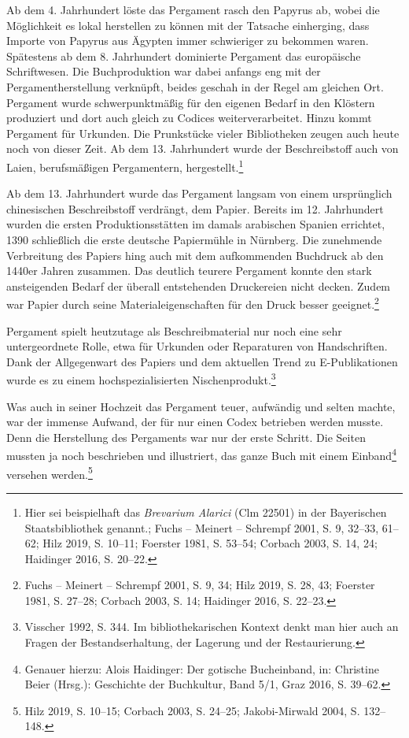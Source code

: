 \documentclass[a4paper,
fontsize=11pt,
oneside,
numbers=noperiodatend,
parskip=half-,
bibliography=totoc,
final
]{scrartcl}
\begin{document}
Ab dem 4. Jahrhundert löste das Pergament rasch den Papyrus ab, wobei
die Möglichkeit es lokal herstellen zu können mit der Tatsache
einherging, dass Importe von Papyrus aus Ägypten immer schwieriger zu
bekommen waren. Spätestens ab dem 8. Jahrhundert dominierte Pergament
das europäische Schriftwesen. Die Buchproduktion war dabei anfangs eng
mit der Pergamentherstellung verknüpft, beides geschah in der Regel am
gleichen Ort. Pergament wurde schwerpunktmäßig für den eigenen Bedarf in
den Klöstern produziert und dort auch gleich zu Codices
weiterverarbeitet. Hinzu kommt Pergament für Urkunden. Die Prunkstücke
vieler Bibliotheken zeugen auch heute noch von dieser Zeit. Ab dem 13.
Jahrhundert wurde der Beschreibstoff auch von Laien, berufsmäßigen
Pergamentern, hergestellt.\footnote{Hier sei beispielhaft das
  \emph{Brevarium Alarici} (Clm 22501) in der Bayerischen
  Staatsbibliothek genannt.; Fuchs -- Meinert -- Schrempf 2001, S. 9,
  32--33, 61--62; Hilz 2019, S. 10--11; Foerster 1981, S. 53--54;
  Corbach 2003, S. 14, 24; Haidinger 2016, S. 20--22.}

Ab dem 13. Jahrhundert wurde das Pergament langsam von einem
ursprünglich chinesischen Beschreibstoff verdrängt, dem Papier. Bereits
im 12. Jahrhundert wurden die ersten Produktionsstätten im damals
arabischen Spanien errichtet, 1390 schließlich die erste deutsche
Papiermühle in Nürnberg. Die zunehmende Verbreitung des Papiers hing
auch mit dem aufkommenden Buchdruck ab den 1440er Jahren zusammen. Das
deutlich teurere Pergament konnte den stark ansteigenden Bedarf der
überall entstehenden Druckereien nicht decken. Zudem war Papier durch
seine Materialeigenschaften für den Druck besser geeignet.\footnote{Fuchs
  -- Meinert -- Schrempf 2001, S. 9, 34; Hilz 2019, S. 28, 43; Foerster
  1981, S. 27--28; Corbach 2003, S. 14; Haidinger 2016, S. 22--23.}

Pergament spielt heutzutage als Beschreibmaterial nur noch eine sehr
untergeordnete Rolle, etwa für Urkunden oder Reparaturen von
Handschriften. Dank der Allgegenwart des Papiers und dem aktuellen Trend
zu E-Publikationen wurde es zu einem hochspezialisierten
Nischenprodukt.\footnote{Visscher 1992, S. 344. Im bibliothekarischen
  Kontext denkt man hier auch an Fragen der Bestandserhaltung, der
  Lagerung und der Restaurierung.}

Was auch in seiner Hochzeit das Pergament teuer, aufwändig und selten
machte, war der immense Aufwand, der für nur einen Codex betrieben
werden musste. Denn die Herstellung des Pergaments war nur der erste
Schritt. Die Seiten mussten ja noch beschrieben und illustriert, das
ganze Buch mit einem Einband\footnote{Genauer hierzu: Alois Haidinger:
  Der gotische Bucheinband, in: Christine Beier (Hrsg.): Geschichte der
  Buchkultur, Band 5/1, Graz 2016, S. 39--62.} versehen
werden.\footnote{Hilz 2019, S. 10--15; Corbach 2003, S. 24--25;
  Jakobi-Mirwald 2004, S. 132--148.}
\end{document}
